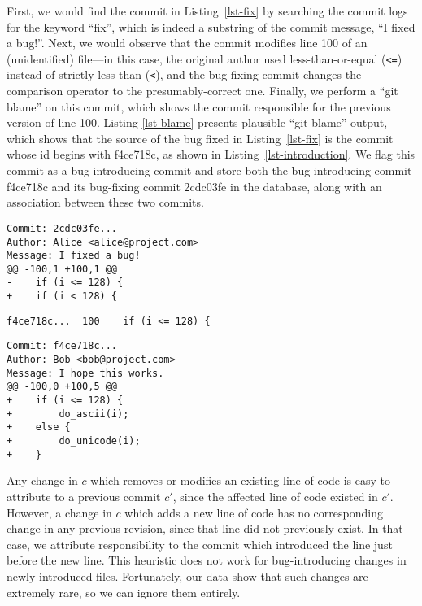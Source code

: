 First, we would find the commit in Listing~\ref{lst-fix} by searching
the commit logs for the keyword ``fix'', which is indeed a substring
of the commit message, ``I fixed a bug!''.  Next, we would observe
that the commit modifies line 100 of an (unidentified) file---in this
case, the original author used less-than-or-equal (\verb+<=+) instead
of strictly-less-than (\verb+<+), and the bug-fixing commit changes the
comparison operator to the presumably-correct one.  Finally, we
perform a ``git blame'' on this commit, which shows the commit
responsible for the previous version of line 100. Listing
\ref{lst-blame} presents plausible ``git blame'' output, which shows
that the source of the bug fixed in Listing~\ref{lst-fix} is the
commit whose id begins with f4ce718c, as shown in
Listing~\ref{lst-introduction}. We flag this commit as a
bug-introducing commit and store both the bug-introducing
commit f4ce718c and its bug-fixing commit 2cdc03fe in the database,
along with an association between these two commits.

\begin{lstlisting}[caption=An example bug-fixing commit,label=lst-fix,frame=single]
Commit: 2cdc03fe...
Author: Alice <alice@project.com>
Message: I fixed a bug!
@@ -100,1 +100,1 @@
-    if (i <= 128) {
+    if (i < 128) {
    \end{lstlisting}

    \begin{lstlisting}[caption={\tt git blame} output for the bug-fixing commit,label=lst-blame,frame=single]
f4ce718c...  100    if (i <= 128) {
    \end{lstlisting}

    \begin{lstlisting}[caption=Associated bug-introducing commit for the example,label=lst-introduction, frame=single]
Commit: f4ce718c...
Author: Bob <bob@project.com>
Message: I hope this works.
@@ -100,0 +100,5 @@
+    if (i <= 128) {
+        do_ascii(i);
+    else {
+        do_unicode(i);
+    }
    \end{lstlisting}

Any change in $c$ which removes or modifies an existing line
of code is easy to attribute to a previous commit $c'$, since the
affected line of code existed in $c'$. However, a change in $c$ which
adds a new line of code has no corresponding change in any previous
revision, since that line did not previously exist. In that case, we
attribute responsibility to the commit which introduced the line just
before the new line. This heuristic does not work for bug-introducing
changes in newly-introduced files. Fortunately, our data show that 
such changes are extremely rare, so we can ignore them entirely.

